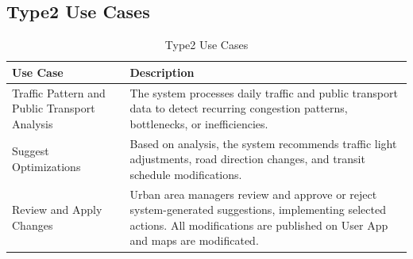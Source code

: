 \documentclass[a4paper,12pt]{article}
\begin{document}
\newpage

\subsection*{Type2 Use Cases}
\begin{table}[h!]
\centering
\begin{tabular}{|p{4.5cm}|p{8.5cm}|}
\hline
\textbf{Use Case} & \textbf{Description} \\
\hline
Traffic Pattern and Public Transport Analysis & The system processes daily traffic and public transport data to detect recurring congestion patterns, bottlenecks, or inefficiencies. \\
\hline
Suggest Optimizations & Based on analysis, the system recommends traffic light adjustments, road direction changes, and transit schedule modifications. \\
\hline
Review and Apply Changes & Urban area managers review and approve or reject system-generated suggestions, implementing selected actions. All modifications are published on User App and maps are modificated. \\
\hline
\end{tabular}
\caption{Type2 Use Cases}
\end{table}
\end{document}

